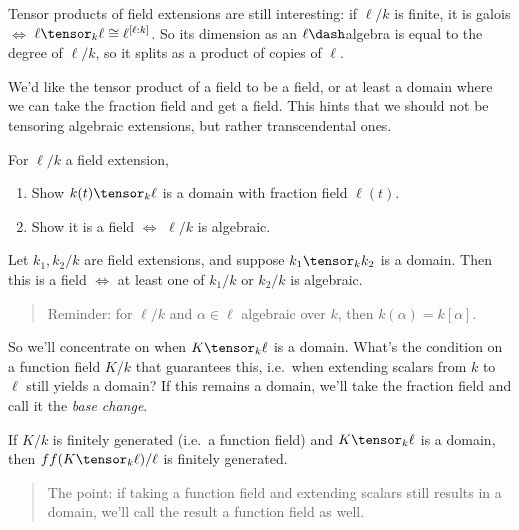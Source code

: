 Tensor products of field extensions are still interesting: if \(\ell/k\)
is finite, it is galois \(\iff\)
\(\ell \tensor_k \ell \cong \ell^{[\ell: k]}\). So its dimension as an
\(\ell\dash\)algebra is equal to the degree of \(\ell/k\), so it splits
as a product of copies of \(\ell\).

\begin{remark}

We'd like the tensor product of a field to be a field, or at least a
domain where we can take the fraction field and get a field. This hints
that we should not be tensoring algebraic extensions, but rather
transcendental ones.

\end{remark}

\begin{exercise}

For \(\ell/k\) a field extension,

\begin{enumerate}
\def\labelenumi{\alph{enumi}.}
\item
  Show \(k(t) \tensor_k \ell\) is a domain with fraction field
  \(\ell(t)\).
\item
  Show it is a field \(\iff\) \(\ell/k\) is algebraic.
\end{enumerate}

\end{exercise}

\begin{proposition}[FT 12.7, 12.8]

Let \(k_1, k_2 / k\) are field extensions, and suppose
\(k_1 \tensor_k k_2\) is a domain. Then this is a field \(\iff\) at
least one of \(k_1/k\) or \(k_2/k\) is algebraic.

\end{proposition}

\begin{quote}
Reminder: for \(\ell/k\) and \(\alpha\in \ell\) algebraic over \(k\),
then \(k(\alpha) = k[\alpha]\).
\end{quote}

So we'll concentrate on when \(K \tensor_k \ell\) is a domain. What's
the condition on a function field \(K/k\) that guarantees this,
i.e.~when extending scalars from \(k\) to \(\ell\) still yields a
domain? If this remains a domain, we'll take the fraction field and call
it the \emph{base change}.

\begin{exercise}

If \(K/k\) is finitely generated (i.e.~a function field) and
\(K\tensor_k \ell\) is a domain, then \(ff(K\tensor_k \ell)/\ell\) is
finitely generated.

\begin{quote}
The point: if taking a function field and extending scalars still
results in a domain, we'll call the result a function field as well.
\end{quote}

\end{exercise}

